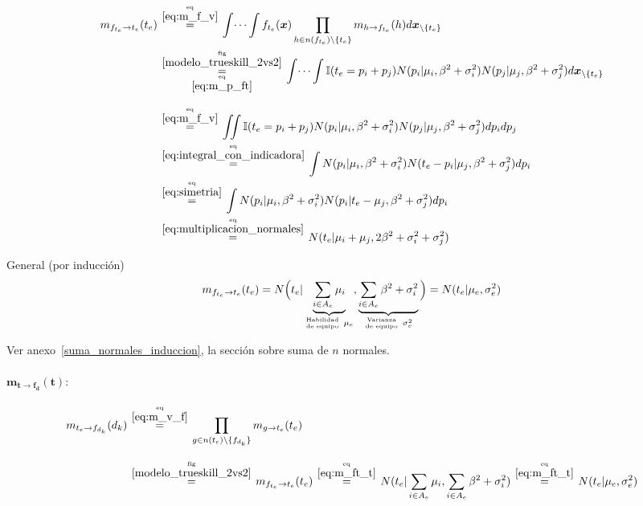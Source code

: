 \documentclass[article]{jss}
\newcommand\hfrac[2]{\genfrac{}{}{0pt}{}{#1}{#2}} %
\begin{document}
\begin{equation}
\begin{split}
 m_{f_{t_e} \rightarrow t_e}(t_e) & \overset{\hfrac{\text{eq}}{\ref{eq:m_f_v}}}{=} \int \dots \int f_{t_e}(\bm{x}) \prod_{h \in n(f_{t_e}) \setminus \{t_e\} } m_{h \rightarrow f_{t_e}}(h) d\bm{x}_{\setminus \{t_e\} }  \\
 & \overset{\hfrac{\text{fig}}{\ref{modelo_trueskill_2vs2}}}{\underset{\hfrac{\text{eq}}{\ref{eq:m_p_ft}}}{=}} \int \dots \int \mathbb{I}(t_e = p_i + p_j) N(p_i|\mu_i,\beta^2 + \sigma_i^2)N(p_j|\mu_j,\beta^2 + \sigma_j^2) d\bm{x}_{\setminus \{t_e\} }\\[0.3cm]
 & \overset{\hfrac{\text{eq}}{\ref{eq:m_f_v}}}{=} \iint \mathbb{I}(t_e = p_i + p_j) N(p_i|\mu_i,\beta^2 + \sigma_i^2)N(p_j|\mu_j,\beta^2 + \sigma_j^2) dp_idp_j \\
 & \overset{\hfrac{\text{eq}}{\ref{eq:integral_con_indicadora}}}{=} \int N(p_i|\mu_i,\beta^2 + \sigma_i^2) N(t_e - p_i|\mu_j,\beta^2 + \sigma_j^2) dp_i   \\
 & \overset{\hfrac{\text{eq}}{\ref{eq:simetria}}}{=} \int N(p_i|\mu_i,\beta^2 + \sigma_i^2) N(p_i|t_e - \mu_j,\beta^2 + \sigma_j^2) dp_i \\
 & \overset{\hfrac{\text{eq}}{\ref{eq:multiplicacion_normales}}}{=} N(t_e|\mu_i+\mu_j,2\beta^2 + \sigma_i^2 + \sigma_j^2)
\end{split}
\end{equation}

\vspace{0.3cm}

General (por inducci\'on)
\begin{equation}\label{eq:m_ft_t}
 m_{f_{t_e} \rightarrow t_e}(t_e) =  N \Big( t_e | \underbrace{\sum_{i\in A_e } \mu_i}_{\hfrac{\text{Habilidad}}{\text{de equipo}} \ \mu_e}, \underbrace{\sum_{i \in A_e} \beta^2 + \sigma_i^2}_{\hfrac{\text{Varianza}}{\text{de equipo}} \ \sigma_e^2} \Big) = N(t_e | \mu_e, \sigma_e^2)
\end{equation}

Ver anexo~\ref{suma_normales_induccion}, la secci\'on sobre suma de $n$ normales.

\paragraph{$\bm{m_{t \rightarrow f_d}(t)}:$}

\begin{equation}\label{eq:m_t_fd}
\begin{split}
m_{t_e \rightarrow f_{d_{k}}}(d_{k}) & \overset{\hfrac{\text{eq}}{\ref{eq:m_v_f}}}{=} \prod_{g \in n(t_e) \setminus  \{f_{d_{k}} \}} m_{g \rightarrow t_e} (t_e) \\[0.3cm]
 & \overset{\hfrac{\text{fig}}{\ref{modelo_trueskill_2vs2}}}{=} m_{f_{t_e} \rightarrow t_e}(t_e) \overset{\hfrac{\text{eq}}{\ref{eq:m_ft_t}}}{=} N(t_e| \sum_{i \in A_e} \mu_i, \sum_{i \in A_e} \beta^2 + \sigma_i^2) \overset{\hfrac{\text{eq}}{\ref{eq:m_ft_t}}}{=} N(t_e|\mu_e,\sigma_e^2)
\end{split}
\end{equation}
\end{document}
